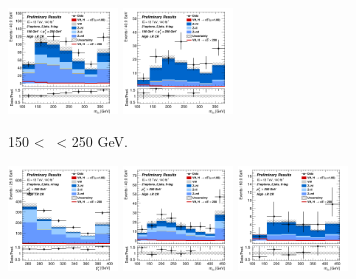 \begin{figure}[h!]
\begin{subfigure}[b]{\textwidth}
        \includegraphics[width=0.32\textwidth]{Images/VH/Own_fit/prefit_VHcc/Region_distmBB_BMax250_BMin150_DCRHigh_J2_TTypelt_T2_L2_Y6051_Prefit.png}
        \includegraphics[width=0.32\textwidth]{Images/VH/Own_fit/prefit_VHcc/Region_distmBB_BMax250_BMin150_DCRHigh_J2_TTypett_T2_L2_Y6051_Prefit.png}
        \caption{150 < \ptv\ < 250 GeV.}
        \label{fig:plots_VHcc_2L_150_CRH_2J}
    \end{subfigure}
    \begin{subfigure}[b]{\textwidth}
        \centering
        \includegraphics[width=0.32\textwidth]{Images/VH/Own_fit/prefit_VHcc/Region_distpTV_BMin250_DCRHigh_J2_TTypent_T1_L2_Y6051_Prefit.png}
        \includegraphics[width=0.32\textwidth]{Images/VH/Own_fit/prefit_VHcc/Region_distmBB_BMin250_DCRHigh_J2_TTypelt_T2_L2_Y6051_Prefit.png}
        \includegraphics[width=0.32\textwidth]{Images/VH/Own_fit/prefit_VHcc/Region_distmBB_BMin250_DCRHigh_J2_TTypett_T2_L2_Y6051_Prefit.png}

\end{subfigure}
\end{figure}
